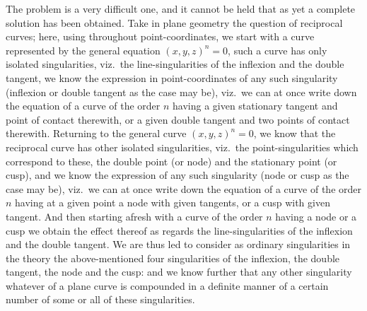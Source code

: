 \documentclass[11pt,a4paper]{article}
\theoremstyle{plain}
\theoremstyle{definition}
\theoremstyle{remark}
\begin{document}
The problem is a very difficult one, and it cannot be held that as yet a complete solution has been obtained. Take in plane geometry the question of reciprocal curves; here, using throughout point-coordinates, we start with a curve represented by the general equation $(x,y,z)^n=0$, such a curve has only isolated singularities, viz.\ the line-singularities of the inflexion and the double tangent, we know the expression in point-coordinates of any such singularity (inflexion or double tangent as the case may be), viz.\ we can at once write down the equation of a curve of the order $n$ having a given stationary tangent and point of contact therewith, or a given double tangent and two points of contact therewith. Returning to the general curve $(x,y,z)^n=0$, we know that the reciprocal curve has other isolated singularities, viz.\ the point-singularities which correspond to these, the double point (or node) and the stationary point (or cusp), and we know the expression of any such singularity (node or cusp as the case may be), viz.\ we can at once write down the equation of a curve of the order $n$ having at a given point a node with given tangents, or a cusp with given tangent. And then starting afresh with a curve of the order $n$ having a node or a cusp we obtain the effect thereof as regards the line-singularities of the inflexion and the double tangent. We are thus led to consider as ordinary singularities in the theory the above-mentioned four singularities of the inflexion, the double tangent, the node and the cusp: and we know further that any other singularity whatever of a plane curve is compounded in a definite manner of a certain number of some or all of these singularities.

\newpage
\setcounter{page}{629}
\end{document}

